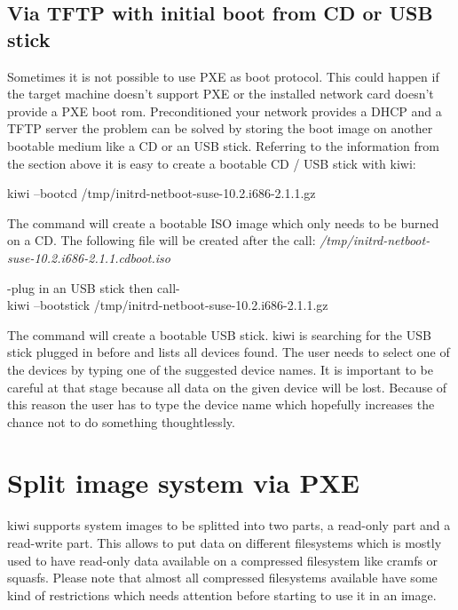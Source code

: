 \subsection{Via TFTP with initial boot from CD or USB stick}
Sometimes it is not possible to use PXE as boot protocol. This could happen
if the target machine doesn't support PXE or the installed network card
doesn't provide a PXE boot rom. Preconditioned your network provides
a DHCP and a TFTP server the problem can be solved by storing the
boot image on another bootable medium like a CD or an USB stick.
Referring to the information from the section above it is easy to create
a bootable CD / USB stick with kiwi:

\begin{Command}{14cm}
	kiwi --bootcd /tmp/initrd-netboot-suse-10.2.i686-2.1.1.gz
\end{Command}

The command will create a bootable ISO image which only needs to be
burned on a CD. The following file will be created after the call:
\textit{/tmp/initrd-netboot-suse-10.2.i686-2.1.1.cdboot.iso}

\begin{Command}{14cm}
    -plug in an USB stick then call-\\
	kiwi --bootstick /tmp/initrd-netboot-suse-10.2.i686-2.1.1.gz
\end{Command}

The command will create a bootable USB stick. kiwi is searching for
the USB stick plugged in before and lists all devices found. The user
needs to select one of the devices by typing one of the suggested
device names. It is important to be careful at that stage because
all data on the given device will be lost. Because of this reason
the user has to type the device name which hopefully increases the
chance not to do something thoughtlessly.

\section{Split image system via PXE}
kiwi supports system images to be splitted into two parts, a read-only
part and a read-write part. This allows to put data on different
filesystems which is mostly used to have read-only data available on
a compressed filesystem like cramfs or squasfs. Please note that almost
all compressed filesystems available have some kind of restrictions
which needs attention before starting to use it in an image.
 
